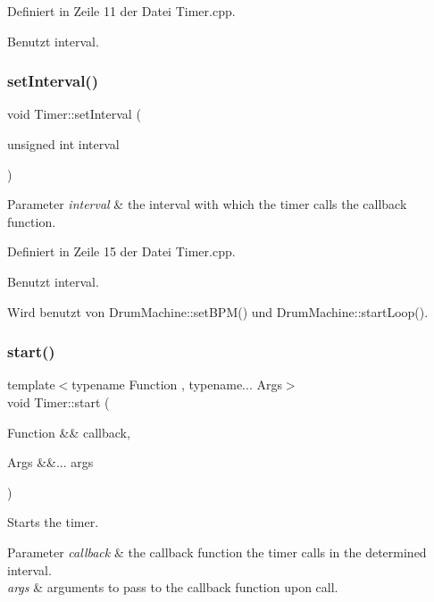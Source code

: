 Definiert in Zeile 11 der Datei Timer.\+cpp.



Benutzt interval.

\mbox{\label{class_timer_a0b24293bfc154f7432b1c52ac857d853}} 
\subsubsection{\texorpdfstring{set\+Interval()}{setInterval()}}
{\footnotesize\ttfamily void Timer\+::set\+Interval (\begin{DoxyParamCaption}\item[{unsigned int}]{interval }\end{DoxyParamCaption})}


\begin{DoxyParams}{Parameter}
{\em interval} & the interval with which the timer calls the callback function. \\
\hline
\end{DoxyParams}


Definiert in Zeile 15 der Datei Timer.\+cpp.



Benutzt interval.



Wird benutzt von Drum\+Machine\+::set\+B\+P\+M() und Drum\+Machine\+::start\+Loop().

\mbox{\label{class_timer_adcf70b5065e31461e27309c96065437a}} 
\subsubsection{\texorpdfstring{start()}{start()}}
{\footnotesize\ttfamily template$<$typename Function , typename... Args$>$ \\
void Timer\+::start (\begin{DoxyParamCaption}\item[{Function \&\&}]{callback,  }\item[{Args \&\&...}]{args }\end{DoxyParamCaption})\hspace{0.3cm}{\ttfamily [inline]}}

Starts the timer. 
\begin{DoxyParams}{Parameter}
{\em callback} & the callback function the timer calls in the determined interval. \\
\hline
{\em args} & arguments to pass to the callback function upon call. \\
\hline
\end{DoxyParams}


